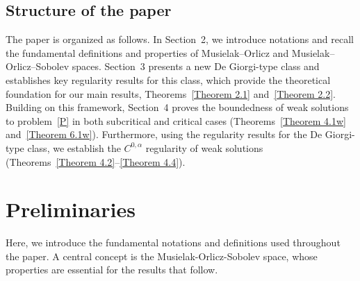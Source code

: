 \documentclass[10pt,reqno]{amsart}
\newcommand *\w{^\wedge}
\theoremstyle{definition}
\numberwithin{equation}{section}
\begin{document}
\subsection{Structure of the paper}
The paper is organized as follows. In Section~2, we introduce notations and recall the fundamental definitions and properties of Musielak--Orlicz and Musielak--Orlicz--Sobolev spaces. 
Section~3 presents a new De Giorgi-type class and establishes key regularity results for this class, which provide the theoretical foundation for our main results, Theorems~\ref{Theorem 2.1} and~\ref{Theorem 2.2}. 
Building on this framework, Section~4 proves the boundedness of weak solutions to problem~\eqref{P} in both subcritical and critical cases (Theorems~\ref{Theorem 4.1w} and~\ref{Theorem 6.1w}). 
Furthermore, using the regularity results for the De Giorgi-type class, we establish the $C^{0,\alpha}$ regularity of weak solutions (Theorems~\ref{Theorem 4.2}--\ref{Theorem 4.4}).


\section{Preliminaries}
Here, we introduce the fundamental notations  and definitions used throughout the paper. A central concept is the Musielak-Orlicz-Sobolev space, whose properties are essential for the results that follow.
\end{document}
